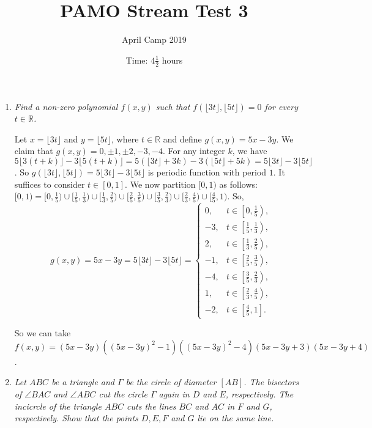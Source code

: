 \documentclass[a4paper, 12pt]{article}
\title{PAMO Stream Test 3}
\author{April Camp 2019}
\date{Time: $4 \frac{1}{2}$ hours}
\begin{document}
 \maketitle

\begin{enumerate}

\item {\itshape Find a non-zero polynomial $f(x, y)$ such that $f(\lfloor 3t \rfloor, \lfloor 5t \rfloor) = 0$ for every $t \in \mathbb{R}$.}

Let $x = \lfloor 3t \rfloor$ and $y = \lfloor 5t \rfloor$, where $t \in \mathbb{R}$ and define $g(x, y) = 5x - 3y$. We claim that $g(x, y) = 0, \pm 1, \pm 2, -3, -4$. For any integer $k$, we have $5 \lfloor 3(t + k) \rfloor - 3 \lfloor 5(t + k) \rfloor = 5(\lfloor 3t \rfloor + 3k) - 3(\lfloor 5t \rfloor + 5k) = 5 \lfloor 3t \rfloor - 3 \lfloor 5t \rfloor$. So $g(\lfloor 3t \rfloor, \lfloor 5t \rfloor) = 5 \lfloor 3t \rfloor - 3 \lfloor 5t \rfloor$ is periodic function with period $1$. It suffices to consider $t \in [0, 1]$. We now partition $[0, 1)$ as follows: $[0, 1) = [0, \frac{1}{5}) \cup [\frac{1}{5}, \frac{1}{3}) \cup [\frac{1}{3}, \frac{2}{5}) \cup [\frac{2}{5}, \frac{3}{5}) \cup [\frac{3}{5}, \frac{2}{3}) \cup [\frac{2}{3}, \frac{4}{5}) \cup [\frac{4}{5}, 1)$. So,
\[
    g(x, y) = 5x - 3y = 5 \lfloor 3t \rfloor - 3 \lfloor 5t \rfloor =
    \begin{cases}
        0,      & t \in \left[0, \frac{1}{5}\right), \\
        -3,     & t \in \left[\frac{1}{5}, \frac{1}{3}\right), \\
        2,      & t \in \left[\frac{1}{3}, \frac{2}{5}\right), \\
        -1,     & t \in \left[\frac{2}{5}, \frac{3}{5}\right), \\
        -4,     & t \in \left[\frac{3}{5}, \frac{2}{3}\right), \\
        1,      & t \in \left[\frac{2}{3}, \frac{4}{5}\right), \\
        -2,     & t \in \left[\frac{4}{5}, 1\right].
    \end{cases}
\]

So we can take $f(x, y) = (5x - 3y)({(5x - 3y)}^2 - 1)({(5x - 3y)}^2 - 4)(5x - 3y + 3)(5x - 3y + 4)$.


\item {\itshape Let $ABC$ be a triangle and $\Gamma$ be the circle of diameter $[AB]$. The bisectors of $\angle BAC$ and $\angle ABC$ cut the circle $\Gamma$ again in $D$ and $E$, respectively. The incicrcle of the triangle $ABC$ cuts the lines $BC$ and $AC$ in $F$ and $G$, respectively. Show that the points $D, E, F$ and $G$ lie on the same line.}



\end{enumerate}
\end{document}
